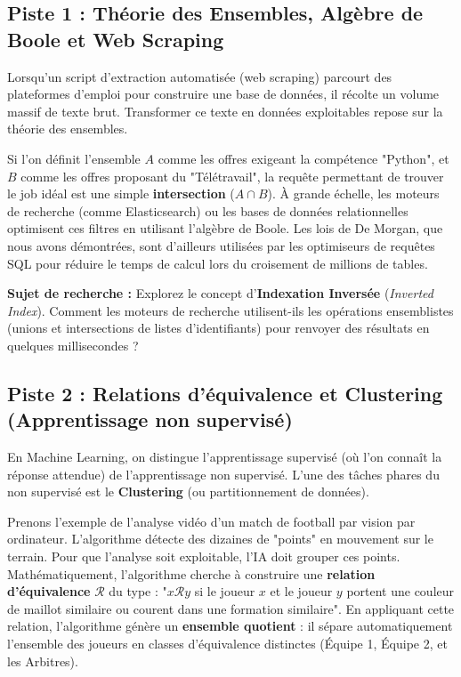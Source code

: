 \documentclass[12pt,a4paper]{report}
\begin{document}
\subsection*{Piste 1 : Théorie des Ensembles, Algèbre de Boole et Web Scraping}
Lorsqu'un script d'extraction automatisée (web scraping) parcourt des plateformes d'emploi pour construire une base de données, il récolte un volume massif de texte brut. Transformer ce texte en données exploitables repose sur la théorie des ensembles. 

Si l'on définit l'ensemble $A$ comme les offres exigeant la compétence "Python", et $B$ comme les offres proposant du "Télétravail", la requête permettant de trouver le job idéal est une simple \textbf{intersection} ($A \cap B$). À grande échelle, les moteurs de recherche (comme Elasticsearch) ou les bases de données relationnelles optimisent ces filtres en utilisant l'algèbre de Boole. Les lois de De Morgan, que nous avons démontrées, sont d'ailleurs utilisées par les optimiseurs de requêtes SQL pour réduire le temps de calcul lors du croisement de millions de tables.

\textbf{Sujet de recherche :} Explorez le concept d'\textbf{Indexation Inversée} (\textit{Inverted Index}). Comment les moteurs de recherche utilisent-ils les opérations ensemblistes (unions et intersections de listes d'identifiants) pour renvoyer des résultats en quelques millisecondes ?

\subsection*{Piste 2 : Relations d'équivalence et Clustering (Apprentissage non supervisé)}
En Machine Learning, on distingue l'apprentissage supervisé (où l'on connaît la réponse attendue) de l'apprentissage non supervisé. L'une des tâches phares du non supervisé est le \textbf{Clustering} (ou partitionnement de données).

Prenons l'exemple de l'analyse vidéo d'un match de football par vision par ordinateur. L'algorithme détecte des dizaines de "points" en mouvement sur le terrain. Pour que l'analyse soit exploitable, l'IA doit grouper ces points. Mathématiquement, l'algorithme cherche à construire une \textbf{relation d'équivalence} $\mathcal{R}$ du type : "$x \mathcal{R} y$ si le joueur $x$ et le joueur $y$ portent une couleur de maillot similaire ou courent dans une formation similaire". 
En appliquant cette relation, l'algorithme génère un \textbf{ensemble quotient} : il sépare automatiquement l'ensemble des joueurs en classes d'équivalence distinctes (Équipe 1, Équipe 2, et les Arbitres).
\end{document}
